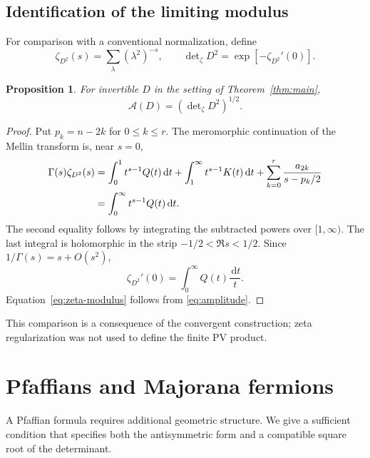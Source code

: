 \documentclass[11pt,a4paper]{article}
\newtheorem{proposition}[theorem]{Proposition}
\theoremstyle{remark}
\newcommand{\dd}{\,\mathrm d}
\numberwithin{equation}{section}
\begin{document}
\subsection{Identification of the limiting modulus}

For comparison with a conventional normalization, define
\[
 \zeta_{D^2}(s)=\sum_\lambda(\lambda^2)^{-s},
 \qquad \det\nolimits_\zeta D^2=\exp[-\zeta_{D^2}'(0)].
\]

\begin{proposition}\label{prop:zeta}
For invertible $D$ in the setting of Theorem~\ref{thm:main},
\begin{equation}\label{eq:zeta-modulus}
 \mathcal A(D)=(\det\nolimits_\zeta D^2)^{1/2}.
\end{equation}
\end{proposition}
\begin{proof}
Put $p_k=n-2k$ for $0\le k\le r$. The meromorphic continuation of
the Mellin transform is, near $s=0$,
\begin{align}
 \Gamma(s)\zeta_{D^2}(s)
 &=\int_0^1 t^{s-1}Q(t)\dd t
   +\int_1^\infty t^{s-1}K(t)\dd t
   +\sum_{k=0}^r\frac{a_{2k}}{s-p_k/2}\notag\\
 &=\int_0^\infty t^{s-1}Q(t)\dd t.\label{eq:zeta-Q}
\end{align}
The second equality follows by integrating the subtracted powers
over $[1,\infty)$. The last integral is holomorphic in the strip
$-1/2<\Re s<1/2$. Since $1/\Gamma(s)=s+O(s^2)$,
\[
 \zeta_{D^2}'(0)=\int_0^\infty Q(t)\frac{\dd t}{t}.
\]
Equation~\eqref{eq:zeta-modulus} follows from \eqref{eq:amplitude}.
\end{proof}

This comparison is a consequence of the convergent construction;
zeta regularization was not used to define the finite PV product.

\section{Pfaffians and Majorana fermions}\label{sec:pf}

A Pfaffian formula requires additional geometric structure. We give
a sufficient condition that specifies both the antisymmetric form
and a compatible square root of the determinant.
\end{document}
